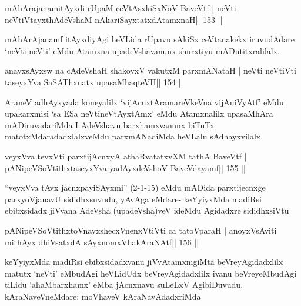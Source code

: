 
\begin{shl}
mAhArajanamitAyxdi rUpaM ceVtAsxkiSxNoV BaveVtf |
neVti neVtiVtayxthA\s\s deVshaM nAkariSayxtatxdA\s\s tamxnaH\hfill || 153 ||
\end{shl}

\begin{artha}
mAhArAjanamf itAyxdiyAgi heVLida rUpavu sAkiSx ceVtanakekx iruvudAdare `neVti neVti' eMdu Atamxna upadeVshavanunx shurxtiyu mADutitxralilalx.
\end{artha}


\begin{shl}
anayxsAyxsw na cA\s\s deVshaH shakoyxV vakutxM parxmANataH |
neVti neVtiVti taseyxYva SaSAThxnatx upasaMhaqteVH\hfill || 154 ||
\end{shl}

\begin{artha}
AraneV adhAyxyada koneyalilx `vijAcnxtAramareVkeVna vijAniVyAtf' eMdu upakarxmisi `sa ESa neVtineVtAyxtAmx' eMdu Atamxnalilx upasaMhAra mADiruvadariMda I AdeVshavu barxhamxvanunx biTuTx matotxMdaradadxlalxveMdu parxmANadiMda heVLalu sAdhayxvilalx.
\end{artha}

\begin{shl}
veyxVva tevxVti parxtijAcnxyA athaRvatatxvXM tathA BaveVtf |
pANipeVSoVtithxtaseyxYva yadAyxdeVshoV BaveVdayamf\hfill || 155 ||
\end{shl}

\begin{artha}
``veyxVva tAvx jacnxpayiSAyxmi'' (2-1-15) eMdu mADida parxtijecnxge
  parxyoVjanavU sididhxsuvudu, yAvAga eMdare- keYyiyxMda madiRsi
  ebibxsidadx jiVvana AdeVsha (upadeVsha)veV ideMdu Agidadxre sididhxsiVtu
\end{artha}

\begin{shl}
pANipeVSoVtithxtoV\s nayxshecxVnenxVtiVti ca tatoV\s paraH |
anoyxV\s sAviti mithAyx dhiVsatxdA sAyxnomxVhakAraNAtf\hfill || 156 ||
\end{shl}

\begin{artha}
keYyiyxMda madiRsi ebibxsidadxvanu jiVvAtamxnigiMta beVreyAgidadxlilx
matutx `neVti' eMbudAgi heVLidUdx beVreyAgidadxlilx ivanu
beVreyeMbudAgi tiLidu `ahaMbarxhamx' eMba jAcnxnavu suLeLxV
AgibiDuvudu. kAraNaveVneMdare; moVhaveV kAraNavAdadxriMda
\end{artha}


